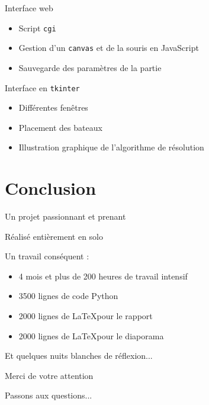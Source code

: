 \begin{frame}{Interface web}
\begin{itemize}
\item Script \texttt{cgi}\pause
\item Gestion d'un \texttt{canvas} et de la souris en JavaScript\pause
\item Sauvegarde des paramètres de la partie
\end{itemize}

\end{frame}

\begin{frame}{Interface en \texttt{tkinter}}
\begin{itemize}
\item Différentes fenêtres\pause
\item Placement des bateaux\pause
\item Illustration graphique de l'algorithme de résolution
\end{itemize}
\end{frame}

\section{Conclusion}
\begin{frame}
Un projet passionnant et prenant\pause

\medskip

Réalisé entièrement en solo\pause

\medskip

Un travail conséquent :\pause

\begin{itemize}
\item 4 mois et plus de 200 heures de travail intensif\\ \pause
\item 3500 lignes de code Python\\ \pause
\item 2000 lignes de \LaTeX pour le rapport\\ \pause
\item 2000  lignes de \LaTeX pour le diaporama\\ \pause
\end{itemize}
Et quelques nuits blanches de réflexion...
\end{frame}

\begin{frame}{}

\begin{center}
{\Huge Merci de votre attention}

\bigskip
Passons aux questions...


\end{center}
\end{frame}




